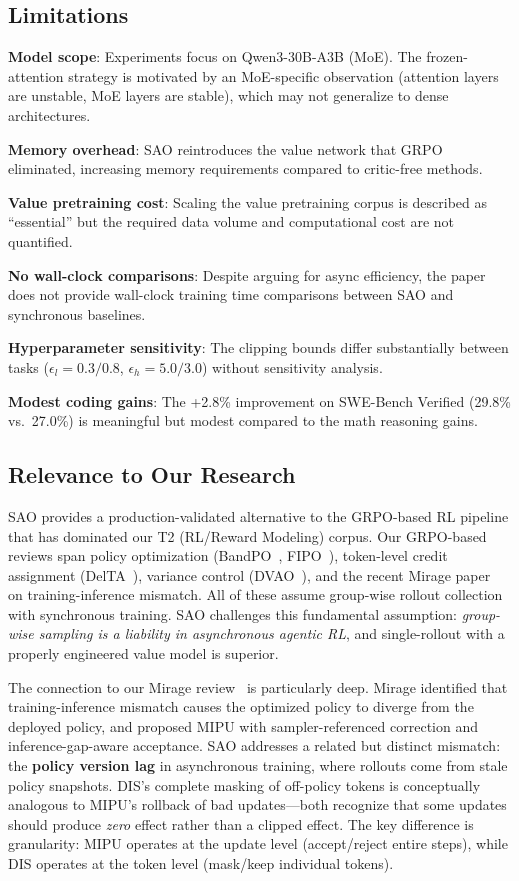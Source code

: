 \documentclass[11pt,a4paper]{article}
\begin{document}
\subsection{Limitations}

\textbf{Model scope}: Experiments focus on Qwen3-30B-A3B (MoE). The frozen-attention strategy is motivated by an MoE-specific observation (attention layers are unstable, MoE layers are stable), which may not generalize to dense architectures.

\textbf{Memory overhead}: SAO reintroduces the value network that GRPO eliminated, increasing memory requirements compared to critic-free methods.

\textbf{Value pretraining cost}: Scaling the value pretraining corpus is described as ``essential'' but the required data volume and computational cost are not quantified.

\textbf{No wall-clock comparisons}: Despite arguing for async efficiency, the paper does not provide wall-clock training time comparisons between SAO and synchronous baselines.

\textbf{Hyperparameter sensitivity}: The clipping bounds differ substantially between tasks ($\epsilon_l = 0.3/0.8$, $\epsilon_h = 5.0/3.0$) without sensitivity analysis.

\textbf{Modest coding gains}: The +2.8\% improvement on SWE-Bench Verified (29.8\% vs.\ 27.0\%) is meaningful but modest compared to the math reasoning gains.

\subsection{Relevance to Our Research}

SAO provides a production-validated alternative to the GRPO-based RL pipeline that has dominated our T2 (RL/Reward Modeling) corpus. Our GRPO-based reviews span policy optimization (BandPO~\cite{bandpo2026}, FIPO~\cite{fipo2026}), token-level credit assignment (DelTA~\cite{delta2026}), variance control (DVAO~\cite{dvao2026}), and the recent Mirage paper~\cite{mirage2026} on training-inference mismatch. All of these assume group-wise rollout collection with synchronous training. SAO challenges this fundamental assumption: \emph{group-wise sampling is a liability in asynchronous agentic RL}, and single-rollout with a properly engineered value model is superior.

The connection to our Mirage review~\cite{mirage2026} is particularly deep. Mirage identified that training-inference mismatch causes the optimized policy to diverge from the deployed policy, and proposed MIPU with sampler-referenced correction and inference-gap-aware acceptance. SAO addresses a related but distinct mismatch: the \textbf{policy version lag} in asynchronous training, where rollouts come from stale policy snapshots. DIS's complete masking of off-policy tokens is conceptually analogous to MIPU's rollback of bad updates---both recognize that some updates should produce \emph{zero} effect rather than a clipped effect. The key difference is granularity: MIPU operates at the update level (accept/reject entire steps), while DIS operates at the token level (mask/keep individual tokens).
\end{document}
